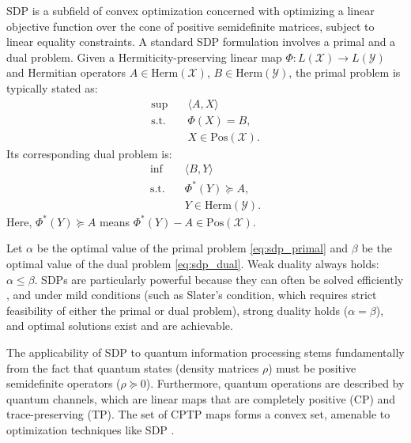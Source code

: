 \documentclass{article} %
\begin{document}
SDP is a subfield of convex optimization concerned with optimizing a linear objective function over the cone of positive semidefinite matrices, subject to linear equality constraints. A standard SDP formulation involves a primal and a dual problem. Given a Hermiticity-preserving linear map $\Phi: L(\mathcal{X}) \to L(\mathcal{Y})$ and Hermitian operators $A \in \mathrm{Herm}(\mathcal{X})$, $B \in \mathrm{Herm}(\mathcal{Y})$, the primal problem is typically stated as:
\begin{equation}
\begin{aligned}
    \sup \quad & \langle A, X \rangle \\
    \text{s.t.} \quad & \Phi(X) = B, \\
                        & X \in \mathrm{Pos}(\mathcal{X}).
\end{aligned}
\label{eq:sdp_primal}
\end{equation}
Its corresponding dual problem is:
\begin{equation}
\begin{aligned}
    \inf \quad & \langle B, Y \rangle \\
    \text{s.t.} \quad & \Phi^*(Y) \succeq A, \\
                        & Y \in \mathrm{Herm}(\mathcal{Y}).
\end{aligned}
\label{eq:sdp_dual}
\end{equation}
Here, $\Phi^*(Y) \succeq A$ means $\Phi^*(Y) - A \in \mathrm{Pos}(\mathcal{X})$. 

Let $\alpha$ be the optimal value of the primal problem \eqref{eq:sdp_primal} and $\beta$ be the optimal value of the dual problem \eqref{eq:sdp_dual}. Weak duality always holds: $\alpha \le \beta$. SDPs are particularly powerful because they can often be solved efficiently \citep{VandenbergheBoyd1996Semidefinite}, and under mild conditions (such as Slater's condition, which requires strict feasibility of either the primal or dual problem), strong duality holds ($\alpha = \beta$), and optimal solutions exist and are achievable.

The applicability of SDP to quantum information processing stems fundamentally from the fact that quantum states (density matrices $\rho$) must be positive semidefinite operators ($\rho \succeq 0$). Furthermore, quantum operations are described by quantum channels, which are linear maps that are completely positive (CP) and trace-preserving (TP). The set of CPTP maps forms a convex set, amenable to optimization techniques like SDP \citep{Watrous2018Theory}.
\end{document}
